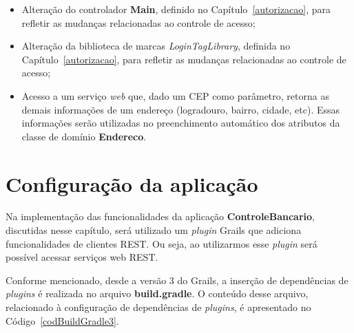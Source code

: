 \begin{itemize}
\begin{itemize}
\end{itemize}

\vspace{0.5cm}

\item     Alteração     do    controlador     {\bf     Main},    definido     no
  Capítulo~\ref{autorizacao}, para refletir as mudanças relacionadas ao controle 
  de acesso;

\vspace{0.5cm}

\item  Alteração da  biblioteca  de marcas  {\it  LoginTagLibrary}, definida  no
  Capítulo~\ref{autorizacao}, para refletir as mudanças relacionadas ao controle
  de acesso; 

\vspace{0.5cm}

\item Acesso a um serviço {\it web}  que, dado um CEP como parâmetro, retorna as
  demais  informações de um  endereço (logradouro,  bairro, cidade,  etc). Essas
  informações  serão utilizadas  no  preenchimento automático  dos atributos  da
  classe de domínio {\bf Endereco}. 

\end{itemize}

\section{Configuração da aplicação} 

\vspace{0.5cm}

    Na   implementação   das
funcionalidades da aplicação  {\bf ControleBancario}, discutidas nesse capítulo,
será utilizado um  {\it plugin} Grails que adiciona  funcionalidades de clientes
REST. Ou seja,  ao utilizarmos esse {\it plugin}  será possível acessar serviços
web REST. 

\vspace{0.2cm}

Conforme mencionado, desde  a versão 3 do Grails, a  inserção de dependências de
{\it  plugins} é  realizada no  arquivo  {\bf build.gradle}.   O conteúdo  desse
arquivo,  relacionado  à  configuração  de  dependências  de  {\it  plugins},  é
apresentado no Código~\ref{codBuildGradle3}.  

\vspace{0.2cm}

